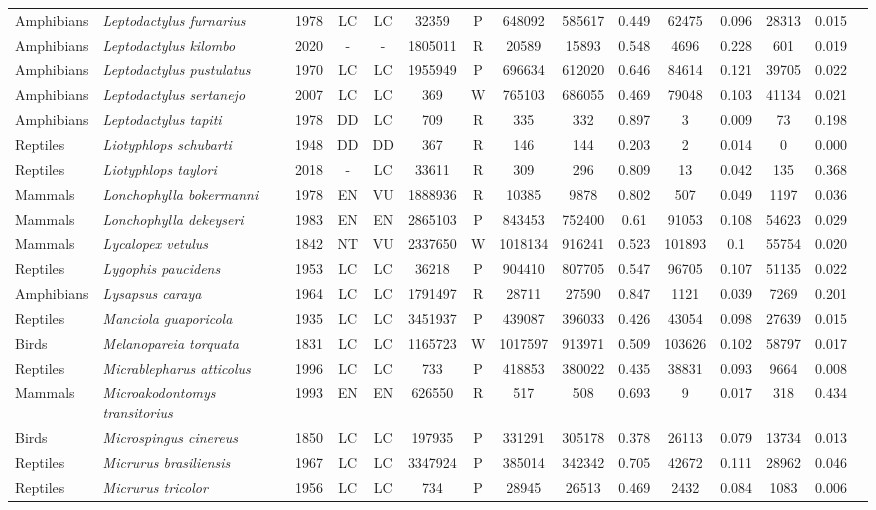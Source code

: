 \documentclass[12pt,openright,oneside,a4paper,english]{abntex2}
\begin{document}
\begin{landscape}
\begin{longtable}{llccccccccccccc}
		Amphibians&\textit{Leptodactylus furnarius}&1978&LC&LC&32359&P&648092&585617&0.449&62475&0.096&28313&0.015\\
		Amphibians&\textit{Leptodactylus kilombo}&2020&-&-&1805011&R&20589&15893&0.548&4696&0.228&601&0.019\\
		Amphibians&\textit{Leptodactylus pustulatus}&1970&LC&LC&1955949&P&696634&612020&0.646&84614&0.121&39705&0.022\\
		Amphibians&\textit{Leptodactylus sertanejo}&2007&LC&LC&369&W&765103&686055&0.469&79048&0.103&41134&0.021\\
		Amphibians&\textit{Leptodactylus tapiti}&1978&DD&LC&709&R&335&332&0.897&3&0.009&73&0.198\\
		Reptiles&\textit{Liotyphlops schubarti}&1948&DD&DD&367&R&146&144&0.203&2&0.014&0&0.000\\
		Reptiles&\textit{Liotyphlops taylori}&2018&-&LC&33611&R&309&296&0.809&13&0.042&135&0.368\\
		Mammals&\textit{Lonchophylla bokermanni}&1978&EN&VU&1888936&R&10385&9878&0.802&507&0.049&1197&0.036\\
		Mammals&\textit{Lonchophylla dekeyseri}&1983&EN&EN&2865103&P&843453&752400&0.61&91053&0.108&54623&0.029\\
		Mammals&\textit{Lycalopex vetulus}&1842&NT&VU&2337650&W&1018134&916241&0.523&101893&0.1&55754&0.020\\
		Reptiles&\textit{Lygophis paucidens}&1953&LC&LC&36218&P&904410&807705&0.547&96705&0.107&51135&0.022\\
		Amphibians&\textit{Lysapsus caraya}&1964&LC&LC&1791497&R&28711&27590&0.847&1121&0.039&7269&0.201\\
		Reptiles&\textit{Manciola guaporicola}&1935&LC&LC&3451937&P&439087&396033&0.426&43054&0.098&27639&0.015\\
		Birds&\textit{Melanopareia torquata}&1831&LC&LC&1165723&W&1017597&913971&0.509&103626&0.102&58797&0.017\\
		Reptiles&\textit{Micrablepharus atticolus}&1996&LC&LC&733&P&418853&380022&0.435&38831&0.093&9664&0.008\\
		Mammals&\textit{Microakodontomys transitorius}&1993&EN&EN&626550&R&517&508&0.693&9&0.017&318&0.434\\
		Birds&\textit{Microspingus cinereus}&1850&LC&LC&197935&P&331291&305178&0.378&26113&0.079&13734&0.013\\
		Reptiles&\textit{Micrurus brasiliensis}&1967&LC&LC&3347924&P&385014&342342&0.705&42672&0.111&28962&0.046\\
		Reptiles&\textit{Micrurus tricolor}&1956&LC&LC&734&P&28945&26513&0.469&2432&0.084&1083&0.006\\

\end{longtable}
\end{landscape}
\end{document}
